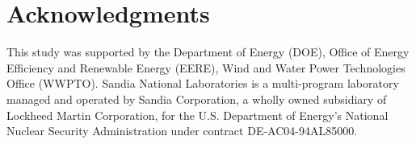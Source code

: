 \documentclass[10pt,letterpaper]{article}
\begin{document}
\section*{Acknowledgments}

This study was supported by the Department of Energy (DOE), Office of Energy
Efficiency and Renewable Energy (EERE), Wind and Water Power Technologies Office
(WWPTO). Sandia National Laboratories is a multi-program laboratory managed and
operated by Sandia Corporation, a wholly owned subsidiary of Lockheed Martin
Corporation, for the U.S. Department of Energy's National Nuclear Security
Administration under contract DE-AC04-94AL85000.

\nolinenumbers

%


\end{document}
